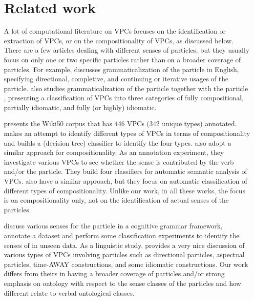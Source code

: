\documentclass[output=paper
,modfonts
,nonflat]{langsci/langscibook}
\begin{document}
\section{Related work} \label{sec:prevwork}
A lot of computational literature on VPCs focuses on the identification or extraction of VPCs, or on the compositionality of VPCs, as discussed below. There are a few articles dealing with different senses of particles, but they usually focus on only one or two specific particles rather than on a broader coverage of particles. For example, \citet{Nii14} discusses grammaticalization of the particle  in English, specifying directional, completive, and continuing or iterative usages of the particle. \citet{Ish10,Ish12} also studies grammaticalization of the particle  together with the particle , presenting a classification of VPCs into three categories of fully compositional, partially idiomatic, and fully (or highly) idiomatic. 

\citet{wiki50} presents the Wiki50 corpus that has 446 VPCs (342 unique types) annotated. \citet{Ban02} makes an attempt to identify different types of VPCs in terms of compositionality and builds a (decision tree) classifier to identify the four types. \citet{Ban03} also adopt a similar approach for compositionality. As an annotation experiment, they investigate various VPCs to see whether the sense is contributed by the verb and/or the particle. They build four classifiers for automatic semantic analysis of VPCs. \citet{Pat04} also have a similar approach, but they focus on automatic classification of different types of compositionality. Unlike our work, in all these works, the focus is on compositionality only, not on the identification of actual senses of the particles.

\citet{Coo06} discuss various senses for the particle  in a cognitive grammar framework, annotate a dataset and perform some classification experiments to identify the senses of  in unseen data. As a linguistic study, \citet{Jac02} provides a very nice discussion of various types of VPCs involving particles such as directional particles, aspectual particles, time-AWAY constructions, and some idiomatic constructions. Our work differs from theirs in having a broader coverage of particles and/or strong emphasis on ontology with respect to the sense classes of the particles and how different  relate to verbal ontological classes.
\end{document}
